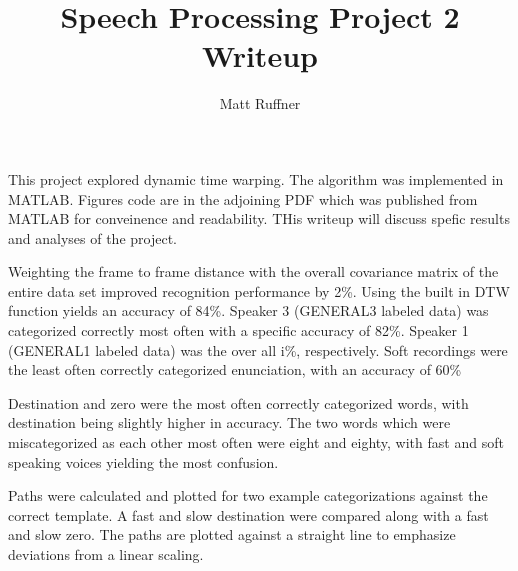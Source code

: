 \documentclass[letterpaper]{article}
\title{Speech Processing Project 2 Writeup}
\author{Matt Ruffner}
\begin{document}
\maketitle

This project explored dynamic time warping. The algorithm was implemented in MATLAB. Figures code are in the adjoining PDF which was published from MATLAB for conveinence and readability. THis writeup will discuss spefic results and analyses of the project.

Weighting the frame to frame distance with the overall covariance matrix of the entire data set improved recognition performance by 2\%. Using the built in DTW function yields an accuracy of 84\%.  Speaker 3 (GENERAL3 labeled data) was categorized correctly most often with a specific accuracy of 82\%. Speaker 1 (GENERAL1 labeled data) was the over all i\%, respectively. Soft recordings were the least often correctly categorized enunciation, with an accuracy of 60\%

Destination and zero were the most often correctly categorized words, with destination being slightly higher in accuracy. The two words which were miscategorized as each other most often were eight and eighty, with fast and soft speaking voices yielding the most confusion.

Paths were calculated and plotted for two example categorizations against the correct template. A fast and slow destination were compared along with a fast and slow zero. The paths are plotted against a straight line to emphasize deviations from a linear scaling.
\end{document}
